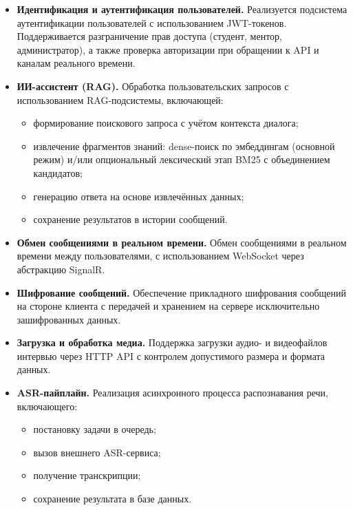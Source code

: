 \documentclass{article}
\begin{document}
\begin{itemize}

\item \textbf{Идентификация и аутентификация пользователей.}  
Реализуется подсистема аутентификации пользователей с использованием JWT-токенов. 
Поддерживается разграничение прав доступа (студент, ментор, администратор), 
а также проверка авторизации при обращении к API и каналам реального времени.
\item \textbf{ИИ-ассистент (RAG).}  
Обработка пользовательских запросов с использованием RAG-подсистемы, включающей:
\begin{itemize}
\item формирование поискового запроса с учётом контекста диалога;
\item извлечение фрагментов знаний: dense-поиск по эмбеддингам (основной режим) и/или опциональный лексический этап BM25 с объединением кандидатов;
\item генерацию ответа на основе извлечённых данных;
\item сохранение результатов в истории сообщений.
\end{itemize}

\item \textbf{Обмен сообщениями в реальном времени.}  
Обмен сообщениями в реальном времени между пользователями, с использованием WebSocket через абстракцию SignalR.

\item \textbf{Шифрование сообщений.}  
Обеспечение прикладного шифрования сообщений на стороне клиента с передачей и хранением на сервере исключительно зашифрованных данных.

\item \textbf{Загрузка и обработка медиа.}  
Поддержка загрузки аудио- и видеофайлов интервью через HTTP API с контролем допустимого размера и формата данных.

\item \textbf{ASR-пайплайн.}  
Реализация асинхронного процесса распознавания речи, включающего:
\begin{itemize}
\item постановку задачи в очередь;
\item вызов внешнего ASR-сервиса;
\item получение транскрипции;
\item сохранение результата в базе данных.
\end{itemize}


\end{itemize}
\end{document}

